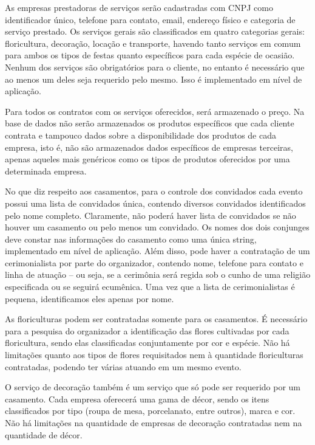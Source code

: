 \documentclass[12pt,a4paper]{article}
\begin{document}
	As empresas prestadoras de serviços serão cadastradas com CNPJ como identificador único, telefone para contato, email, endereço físico e categoria de serviço prestado. Os serviços gerais são classificados em quatro categorias gerais: floricultura, decoração, locação e transporte, havendo tanto serviços em comum para ambos os tipos de festas quanto específicos para cada espécie de ocasião. Nenhum dos serviços são obrigatórios para o cliente, no entanto é necessário que ao menos um deles seja requerido pelo mesmo. Isso é implementado em nível de aplicação.
    
Para todos os contratos com os serviços oferecidos, será armazenado o preço. Na base de dados não serão armazenados os produtos específicos que cada cliente contrata e tampouco dados sobre a disponibilidade dos produtos de cada empresa, isto é, não são armazenados dados específicos de empresas terceiras, apenas aqueles mais genéricos como os tipos de produtos oferecidos por uma determinada empresa. 

    No que diz respeito aos casamentos, para o controle dos convidados cada evento possui uma lista de convidados única, contendo diversos convidados identificados pelo nome completo. Claramente, não poderá haver lista de convidados se não houver um casamento ou pelo menos um convidado. Os nomes dos dois conjunges deve constar nas informações do casamento como uma única string, implementado em nível de aplicação. Além disso, pode haver a contratação de um cerimonialista por parte do organizador, contendo nome, telefone para contato e linha de atuação -- ou seja, se a cerimônia será regida sob o cunho de uma religião especificada ou se seguirá ecumênica. Uma vez que a lista de cerimonialistas é pequena, identificamos eles apenas por nome.

	As floriculturas podem ser contratadas somente para os casamentos. É necessário para a pesquisa do organizador a identificação das flores cultivadas por cada floricultura, sendo elas classificadas conjuntamente por cor e espécie. Não há limitações quanto aos tipos de flores requisitados nem à quantidade floriculturas contratadas, podendo ter várias atuando em um mesmo evento.
    
	O serviço de decoração também é um serviço que só pode ser requerido por um casamento. Cada empresa oferecerá uma gama de décor, sendo os itens classificados por tipo (roupa de mesa, porcelanato, entre outros), marca e cor. Não há limitações na quantidade de empresas de decoração contratadas nem na quantidade de décor.
\end{document}
